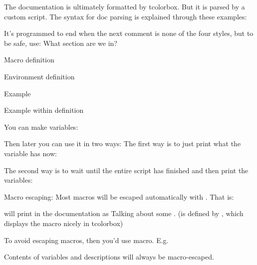 The documentation is ultimately formatted by tcolorbox. But it is parsed by a custom script.
The syntax for doc parsing is explained through these examples:

It's programmed to end when the next comment is none of the four styles, but to be safe, use:
What section are we in?


Macro definition

Environment definition

Example

Example within definition

You can make variables:

Then later you can use it in two ways:
The first way is to just print what the variable has now:

The second way is to wait until the entire script has finished and then
print the variables:

Macro escaping:
Most macros will be escaped automatically with \dac. That is:

will print in the documentation as Talking about some .
(\dac is defined by \let\dac\DocumentAuxCommand, which displays the macro nicely in tcolorbox)

To avoid escaping macros, then you'd use \!macro. E.g.

Contents of variables and descriptions will always be macro-escaped.
